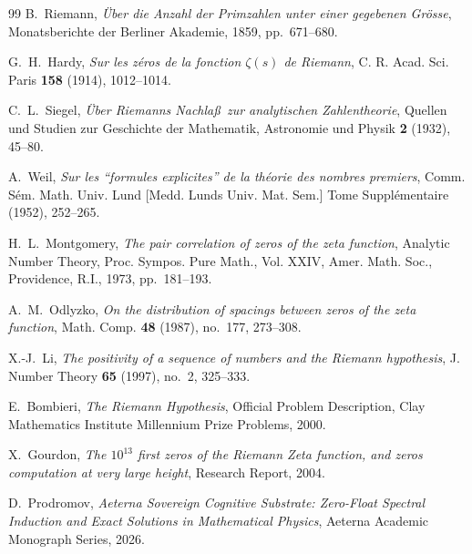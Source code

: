 \documentclass[11pt,reqno]{amsart}
\theoremstyle{definition}
\theoremstyle{remark}
\numberwithin{equation}{section}
\begin{document}
\begin{thebibliography}{99}
B.~Riemann, \emph{\"Uber die Anzahl der Primzahlen unter einer gegebenen Gr\"osse}, Monatsberichte der Berliner Akademie, 1859, pp.~671--680.

G.~H.~Hardy, \emph{Sur les z\'eros de la fonction $\zeta(s)$ de Riemann}, C. R. Acad. Sci. Paris \textbf{158} (1914), 1012--1014.

C.~L.~Siegel, \emph{\"Uber Riemanns Nachla\ss\ zur analytischen Zahlentheorie}, Quellen und Studien zur Geschichte der Mathematik, Astronomie und Physik \textbf{2} (1932), 45--80.

A.~Weil, \emph{Sur les ``formules explicites'' de la th\'eorie des nombres premiers}, Comm. S\'em. Math. Univ. Lund [Medd. Lunds Univ. Mat. Sem.] Tome Suppl\'ementaire (1952), 252--265.

H.~L.~Montgomery, \emph{The pair correlation of zeros of the zeta function}, Analytic Number Theory, Proc. Sympos. Pure Math., Vol. XXIV, Amer. Math. Soc., Providence, R.I., 1973, pp.~181--193.

A.~M.~Odlyzko, \emph{On the distribution of spacings between zeros of the zeta function}, Math. Comp. \textbf{48} (1987), no.~177, 273--308.

X.-J.~Li, \emph{The positivity of a sequence of numbers and the Riemann hypothesis}, J. Number Theory \textbf{65} (1997), no.~2, 325--333.

E.~Bombieri, \emph{The Riemann Hypothesis}, Official Problem Description, Clay Mathematics Institute Millennium Prize Problems, 2000.

X.~Gourdon, \emph{The $10^{13}$ first zeros of the Riemann Zeta function, and zeros computation at very large height}, Research Report, 2004.

D.~Prodromov, \emph{Aeterna Sovereign Cognitive Substrate: Zero-Float Spectral Induction and Exact Solutions in Mathematical Physics}, Aeterna Academic Monograph Series, 2026.
\end{thebibliography}
\end{document}
